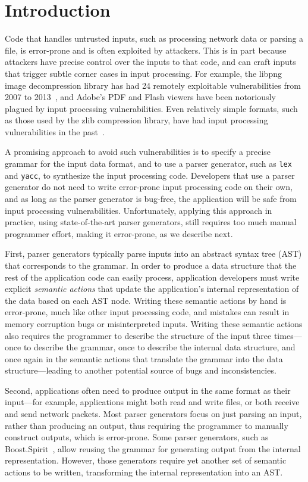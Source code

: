 \section{Introduction}

Code that handles untrusted inputs, such as processing network
data or parsing a file, is error-prone and is often exploited by
attackers.  This is in part because attackers have precise control
over the inputs to that code, and can craft inputs that trigger
subtle corner cases in input processing.  For example, the libpng image decompression
library has had 24 remotely exploitable vulnerabilities from 2007 to
2013~\cite{cvedetails:libpng},
and Adobe's PDF and Flash viewers have been notoriously
plagued by input processing vulnerabilities.  Even relatively
simple formats, such as those used by the zlib compression
library, have had input processing vulnerabilities in the
past~\cite{cvedetails:zlib}.

A promising approach to avoid such vulnerabilities is to specify
a precise grammar for the input data format, and to use a parser
generator, such as {\tt lex} and {\tt yacc}, to synthesize the input
processing code.  Developers that use a parser generator do not need
to write error-prone input processing code on their own, and as long
as the parser generator is bug-free, the application will be safe from
input processing vulnerabilities.  Unfortunately, applying this approach
in practice, using state-of-the-art parser generators, still requires
too much manual programmer effort, making it error-prone, as we describe
next.

First, parser generators typically parse inputs into an abstract syntax
tree (AST) that corresponds to the grammar.  In order to produce a data
structure that the rest of the application code can easily process,
application developers must write explicit {\em semantic actions} that
update the application's internal representation of the data based on
each AST node.  Writing these semantic actions by hand is error-prone,
much like other input processing code, and mistakes can result in memory
corruption bugs or misinterpreted inputs.  Writing these semantic actions
also requires the programmer to describe the structure of the input three
times---once to describe the grammar, once to describe the internal data
structure, and once again in the semantic actions that translate the
grammar into the data structure---leading to another potential source
of bugs and inconsistencies.

Second,  applications often need to produce output in the same
format as their input---for example, applications might both
read and write files, or both receive and send network packets.
Most parser generators focus on just parsing an input, rather
than producing an output, thus requiring the programmer to manually
construct outputs, which is error-prone.  Some parser generators, such as
Boost.Spirit~\cite{boost-spirit},
allow reusing the grammar for generating output from the internal
representation.  However, those generators require yet another set of
semantic actions to be written, transforming the internal representation
into an AST\@.

